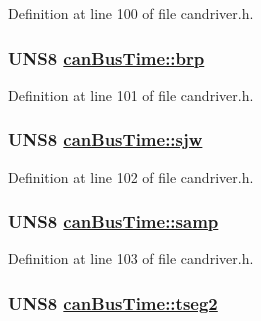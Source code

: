 Definition at line 100 of file candriver.h.\hypertarget{structcanBusTime_f2230f4eeb1d12dd051e7f6369cb1ebb}{
\subsubsection[brp]{\setlength{\rightskip}{0pt plus 5cm}UNS8 \hyperlink{structcanBusTime_f2230f4eeb1d12dd051e7f6369cb1ebb}{can\-Bus\-Time::brp}}}
\label{structcanBusTime_f2230f4eeb1d12dd051e7f6369cb1ebb}




Definition at line 101 of file candriver.h.\hypertarget{structcanBusTime_deeefef09ef47dba2df92b45e563368f}{
\subsubsection[sjw]{\setlength{\rightskip}{0pt plus 5cm}UNS8 \hyperlink{structcanBusTime_deeefef09ef47dba2df92b45e563368f}{can\-Bus\-Time::sjw}}}
\label{structcanBusTime_deeefef09ef47dba2df92b45e563368f}




Definition at line 102 of file candriver.h.\hypertarget{structcanBusTime_a14822cbe84c152c1c79901f0c4fd0f1}{
\subsubsection[samp]{\setlength{\rightskip}{0pt plus 5cm}UNS8 \hyperlink{structcanBusTime_a14822cbe84c152c1c79901f0c4fd0f1}{can\-Bus\-Time::samp}}}
\label{structcanBusTime_a14822cbe84c152c1c79901f0c4fd0f1}




Definition at line 103 of file candriver.h.\hypertarget{structcanBusTime_7bafebcf05024a19e463f29b1c09c390}{
\subsubsection[tseg2]{\setlength{\rightskip}{0pt plus 5cm}UNS8 \hyperlink{structcanBusTime_7bafebcf05024a19e463f29b1c09c390}{can\-Bus\-Time::tseg2}}}
\label{structcanBusTime_7bafebcf05024a19e463f29b1c09c390}




